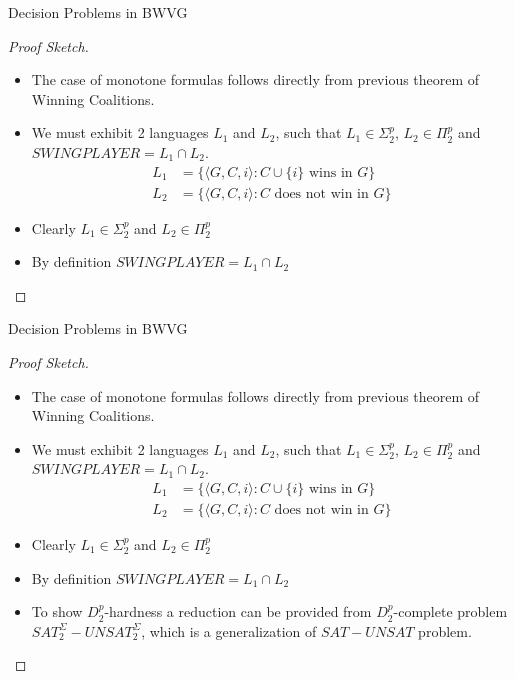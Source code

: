 \documentclass{beamer}
\begin{document}
\begin{frame}[fragile]{Decision Problems in BWVG}
  \begin{proof}[Proof Sketch]
    \begin{itemize}
      \item The case of monotone formulas follows directly from previous theorem of Winning Coalitions.
      \item We must exhibit 2 languages $L_1$ and $L_2$, such that $L_1 \in \Sigma_2^p$, $L_2 \in \Pi_2^p$ and $SWINGPLAYER = L_1 \cap L_2$.
      \begin{subequations}
        \begin{align}
          L_1 &= \{ \langle G, C, i \rangle : C \cup \{i\} \text{ wins in } G \}\\
          L_2 &= \{ \langle G, C, i \rangle : C \text{ does not win in } G \}
        \end{align}
      \end{subequations}
      \item Clearly $L_1 \in \Sigma_2^p$ and $L_2 \in \Pi_2^p$
      \item By definition $SWINGPLAYER = L_1 \cap L_2$
    \end{itemize}
  \end{proof}
\end{frame}


\begin{frame}[fragile]{Decision Problems in BWVG}
  \begin{proof}[Proof Sketch]
    \begin{itemize}
      \item The case of monotone formulas follows directly from previous theorem of Winning Coalitions.
      \item We must exhibit 2 languages $L_1$ and $L_2$, such that $L_1 \in \Sigma_2^p$, $L_2 \in \Pi_2^p$ and $SWINGPLAYER = L_1 \cap L_2$.
      \begin{subequations}
        \begin{align}
          L_1 &= \{ \langle G, C, i \rangle : C \cup \{i\} \text{ wins in } G \}\\
          L_2 &= \{ \langle G, C, i \rangle : C \text{ does not win in } G \}
        \end{align}
      \end{subequations}
      \item Clearly $L_1 \in \Sigma_2^p$ and $L_2 \in \Pi_2^p$
      \item By definition $SWINGPLAYER = L_1 \cap L_2$
      \item To show $D_2^p$-hardness a reduction can be provided from $D_2^p$-complete problem $SAT_2^\Sigma-UNSAT_2^\Sigma$, which is a generalization of $SAT-UNSAT$ problem.
    \end{itemize}
  \end{proof}
\end{frame}
\end{document}
